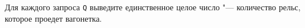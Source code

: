 Для каждого запроса \texttt{Q} выведите единственное целое число "--- количество
рельс, которое проедет вагонетка.


